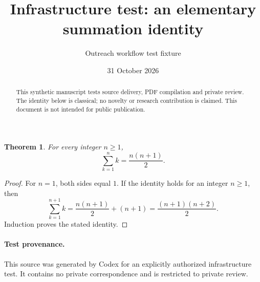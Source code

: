 \documentclass[11pt]{article}
\title{Infrastructure test: an elementary summation identity}
\author{Outreach workflow test fixture}
\date{31 October 2026}
\newtheorem{theorem}{Theorem}
\begin{document}
\maketitle
\begin{abstract}
This synthetic manuscript tests source delivery, PDF compilation and private
review. The identity below is classical; no novelty or research contribution is
claimed. This document is not intended for public publication.
\end{abstract}
\begin{theorem}\label{thm:test}
For every integer $n\geq 1$,
\[
  \sum_{k=1}^{n} k = \frac{n(n+1)}{2}.
\]
\end{theorem}
\begin{proof}
For $n=1$, both sides equal $1$. If the identity holds for an integer $n\geq1$,
then
\[
\sum_{k=1}^{n+1} k
=\frac{n(n+1)}2+(n+1)
=\frac{(n+1)(n+2)}2.
\]
Induction proves the stated identity.
\end{proof}
\paragraph{Test provenance.}
This source was generated by Codex for an explicitly authorized infrastructure
test. It contains no private correspondence and is restricted to private review.
\end{document}
